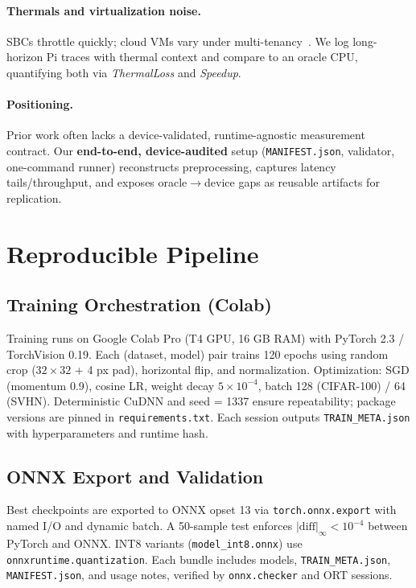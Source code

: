 \documentclass{article}
\begin{document}
\paragraph{Thermals and virtualization noise.}
SBCs throttle quickly; cloud VMs vary under multi-tenancy~\cite{thermals_arxiv,cloud_variability}. We log long-horizon Pi traces with thermal context and compare to an oracle CPU, quantifying both via \emph{ThermalLoss} and \emph{Speedup}.

\paragraph*{Positioning.}
Prior work often lacks a device-validated, runtime-agnostic measurement contract. Our \textbf{end-to-end, device-audited} setup (\texttt{MANIFEST.json}, validator, one-command runner) reconstructs preprocessing, captures latency tails/throughput, and exposes oracle$\!\to$device gaps as reusable artifacts for replication.


\section{Reproducible Pipeline}

\subsection{Training Orchestration (Colab)}
Training runs on Google Colab Pro (T4 GPU, 16 GB RAM) with PyTorch 2.3 / TorchVision 0.19.  
Each (dataset, model) pair trains 120 epochs using random crop ($32{\times}32$ + 4 px pad), horizontal flip, and normalization.  
Optimization: SGD (momentum 0.9), cosine LR, weight decay $5{\times}10^{-4}$, batch 128 (CIFAR-100) / 64 (SVHN).  
Deterministic CuDNN and seed = 1337 ensure repeatability; package versions are pinned in \verb|requirements.txt|.  
Each session outputs \texttt{TRAIN\_META.json} with hyperparameters and runtime hash.

\subsection{ONNX Export and Validation}
Best checkpoints are exported to ONNX opset 13 via \verb|torch.onnx.export| with named I/O and dynamic batch.  
A 50-sample test enforces $|\text{diff}|_\infty<10^{-4}$ between PyTorch and ONNX.  
INT8 variants (\texttt{model\_int8.onnx}) use \texttt{onnxruntime.quantization}.  
Each bundle includes models, \texttt{TRAIN\_META.json}, \texttt{MANIFEST.json}, and usage notes, verified by \texttt{onnx.checker} and ORT sessions.
\end{document}
